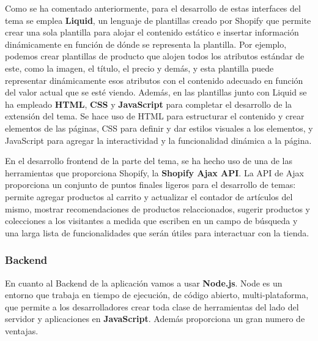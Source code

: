 \documentclass[12pt]{article}
\begin{document}
Como se ha comentado anteriormente, para el desarrollo de estas interfaces del tema se emplea \textbf{Liquid}, un lenguaje de plantillas creado por Shopify que
permite crear una sola plantilla para alojar el contenido estático e insertar información dinámicamente en función de dónde se representa la plantilla.
Por ejemplo, podemos crear plantillas de producto que alojen todos los atributos estándar de este, como la imagen, el título, el precio y demás, y esta 
plantilla puede representar dinámicamente esos atributos con el contenido adecuado en función del valor actual que se esté viendo. \cite{shopify-dev}
Además, en las plantillas junto con Liquid se ha empleado \textbf{HTML}, \textbf{CSS} y \textbf{JavaScript} para completar el desarrollo de la extensión del tema. Se hace uso de HTML para estructurar
el contenido y crear elementos de las páginas, CSS para definir y dar estilos visuales a los elementos, y JavaScript para agregar la interactividad y la 
funcionalidad dinámica a la página. 

En el desarrollo frontend de la parte del tema, se ha hecho uso de una de las herramientas que proporciona Shopify, la \textbf{Shopify Ajax API}. La API de Ajax
proporciona un conjunto de puntos finales ligeros para el desarrollo de temas: permite agregar productos al carrito y actualizar el contador
de artículos del mismo, mostrar recomendaciones de productos relaccionados, sugerir productos y colecciones a los visitantes a medida que escriben
en un campo de búsqueda y una larga lista de funcionalidades que serán útiles para interactuar con la tienda.\cite{shopify-dev}

\subsubsection{Backend}
En cuanto al Backend de la aplicación vamos a usar \textbf{Node.js}. Node es un entorno que trabaja en tiempo de ejecución, de código abierto, multi-plataforma, 
que permite a los desarrolladores crear toda clase de herramientas del lado del servidor y aplicaciones en \textbf{JavaScript}. 
Además proporciona un gran numero de ventajas. 
\end{document}
